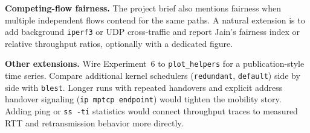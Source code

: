 \label{sec:future}

\textbf{Competing-flow fairness.} The project brief also mentions fairness when multiple independent flows contend for the same paths. A natural extension is to add background \texttt{iperf3} or UDP cross-traffic and report Jain's fairness index or relative throughput ratios, optionally with a dedicated figure.

\textbf{Other extensions.} Wire Experiment~6 to \texttt{plot\_helpers} for a publication-style time series. Compare additional kernel schedulers (\texttt{redundant}, \texttt{default}) side by side with \texttt{blest}. Longer runs with repeated handovers and explicit address handover signaling (\texttt{ip mptcp endpoint}) would tighten the mobility story. Adding ping or \texttt{ss -ti} statistics would connect throughput traces to measured RTT and retransmission behavior more directly.
